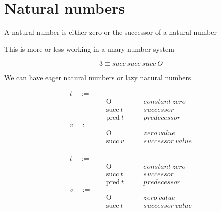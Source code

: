 
\section{Natural numbers}

\begin{frame}[c]
  A natural number is either zero or the successor of a natural number
\end{frame}

\begin{frame}[c]
  This is more or less working in a unary number system
\end{frame}

\begin{frame}[c]
  \begin{displaymath}
    3 \equiv succ~succ~succ~O
  \end{displaymath}
\end{frame}

\begin{frame}[c]
  We can have eager natural numbers or lazy natural numbers
\end{frame}

\begin{frame}
  \begin{mdframed}[frametitle={Terms and values (eager)}]
\begin{displaymath}
    \begin{aligned}
t \quad:=\quad& ~ &\\
  & ~ \text{O} \quad\quad &constant~zero \\
  & ~ \text{succ}~t \quad\quad &successor \\
  & ~ \text{pred}~t \quad\quad &predecessor \\
v \quad:=\quad& ~ &\\
  & ~ \text{O} \quad\quad &zero~value \\
  & ~ \text{succ}~v \quad\quad &successor~value \\
    \end{aligned}
  \end{displaymath}
  \end{mdframed}
\end{frame}

\begin{frame}
  \begin{mdframed}[frametitle={Terms and values (lazy)}]
\begin{displaymath}
    \begin{aligned}
t \quad:=\quad& ~ &\\
  & ~ \text{O} \quad\quad &constant~zero \\
  & ~ \text{succ}~t \quad\quad &successor \\
  & ~ \text{pred}~t \quad\quad &predecessor \\
v \quad:=\quad& ~ &\\
  & ~ \text{O} \quad\quad &zero~value \\
  & ~ \text{succ}~t \quad\quad &successor~value \\
    \end{aligned}
  \end{displaymath}
  \end{mdframed}
\end{frame}

